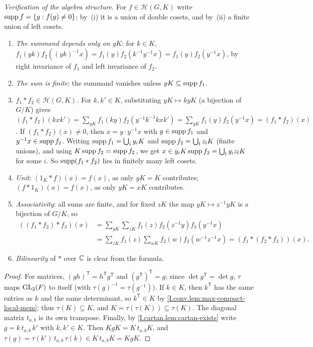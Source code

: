 \noindent\emph{Verification of the algebra structure.} For $f\in\mathcal H(G,K)$ write
$\operatorname{supp} f=\{g:f(g)\neq0\}$; by~(i) it is a union of double cosets, and by~(ii) a finite union of left cosets.
\begin{enumerate}[label=(\alph*)]
\item \emph{The summand depends only on $yK$}: for $k\in K$,
  $f_1(yk)f_2((yk)^{-1}x)=f_1(y)f_2(k^{-1}y^{-1}x)=f_1(y)f_2(y^{-1}x)$, by right invariance of $f_1$ and left
  invariance of $f_2$.
\item \emph{The sum is finite}: the summand vanishes unless $yK\subseteq\operatorname{supp} f_1$.
\item \emph{$f_1*f_2\in\mathcal H(G,K)$.} For $k,k'\in K$, substituting $yK\mapsto kyK$ (a bijection of $G/K$) gives
  $(f_1*f_2)(kxk')=\sum_{yK}f_1(ky)f_2(y^{-1}k^{-1}kxk')=\sum_{yK}f_1(y)f_2(y^{-1}x)=(f_1*f_2)(x)$. If
  $(f_1*f_2)(x)\neq0$, then $x=y\cdot y^{-1}x$ with $y\in\operatorname{supp} f_1$ and $y^{-1}x\in\operatorname{supp} f_2$. Writing
  $\operatorname{supp} f_1=\bigcup_iy_iK$ and $\operatorname{supp} f_2=\bigcup_lz_lK$ (finite unions), and using $K\operatorname{supp} f_2=\operatorname{supp} f_2$, we get
  $x\in y_iK\operatorname{supp} f_2=\bigcup_ly_iz_lK$ for some $i$. So $\operatorname{supp}(f_1*f_2)$ lies in finitely many left cosets.
\item \emph{Unit}: $(1_K*f)(x)=f(x)$, as only $yK=K$ contributes; $(f*1_K)(x)=f(x)$, as only $yK=xK$ contributes.
\item \emph{Associativity}: all sums are finite, and for fixed $zK$ the map $yK\mapsto z^{-1}yK$ is a bijection of
  $G/K$, so
  \begin{align*}
    ((f_1*f_2)*f_3)(x)&=\sum_{yK}\sum_{zK}f_1(z)f_2(z^{-1}y)f_3(y^{-1}x)\\
    &=\sum_{zK}f_1(z)\sum_{wK}f_2(w)f_3(w^{-1}z^{-1}x)=(f_1*(f_2*f_3))(x).
  \end{align*}
\item \emph{Bilinearity} of $*$ over $\mathbb{C}$ is clear from the formula.
\end{enumerate}

\begin{lemma}
\end{lemma}
\begin{proof}
For matrices, $(gh)^{\mathsf T}=h^{\mathsf T}g^{\mathsf T}$ and $(g^{\mathsf T})^{\mathsf T}=g$; since
$\det g^{\mathsf T}=\det g$, $\tau$ maps $\mathrm{GL}_2(F)$ to itself (with $\tau(g)^{-1}=\tau(g^{-1})$). If $k\in K$, then
$k^{\mathsf T}$ has the same entries as $k$ and the same determinant, so $k^{\mathsf T}\in K$ by
\cref{I.conv.lem:max-compact-local-mem}; thus $\tau(K)\subseteq K$, and $K=\tau(\tau(K))\subseteq\tau(K)$. The
diagonal matrix $t_{a,b}$ is its own transpose. Finally, by \cref{I.cartan.lem:cartan-exists} write
$g=k\,t_{a,b}\,k'$ with $k,k'\in K$. Then $KgK=K\,t_{a,b}K$, and
$\tau(g)=\tau(k')\,t_{a,b}\,\tau(k)\in K\,t_{a,b}K=KgK$.
\end{proof}

